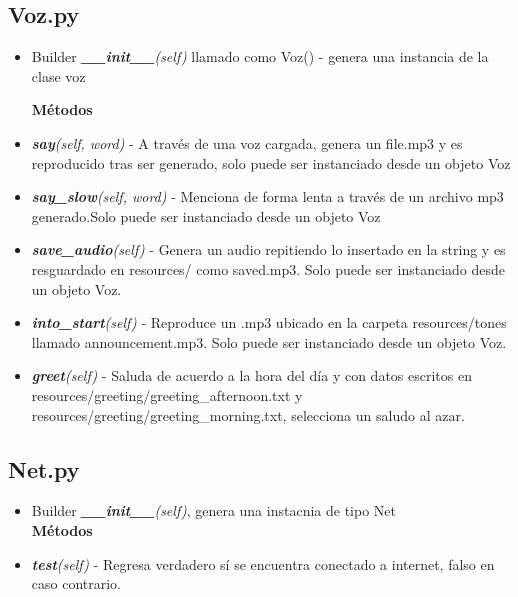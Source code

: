 \documentclass{article}
\begin{document}
    \subsection{Voz.py}
        \begin{itemize}
            \item
            \begin{lstlistings}
            Builder \textit{\textbf{\_\_init\_\_}(self)} llamado como Voz() - genera una instancia de la clase voz
            
            \end{lstlistings}
            
           \textbf{Métodos}
            \item \textit{\textbf{say}(self, word)}  - A través de una voz cargada, genera un file.mp3 y es reproducido tras ser generado, solo puede ser instanciado desde un objeto Voz
            
            \item \textit{\textbf{say\_slow}(self, word)} - Menciona de forma lenta a través de un archivo mp3 generado.Solo puede ser instanciado desde un objeto Voz
            
            \item \textit{\textbf{save\_audio}(self)} - Genera un audio repitiendo lo insertado en la string y es resguardado en resources/ como saved.mp3. Solo puede ser instanciado desde un objeto Voz.
            
            \item \textit{\textbf{into\_start}(self)} - Reproduce un .mp3 ubicado en la carpeta resources/tones llamado announcement.mp3. Solo puede ser instanciado desde un objeto Voz.
            
            \item \textit{\textbf{greet}(self)} - Saluda de acuerdo a la hora del día y con datos escritos en resources/greeting/greeting\_afternoon.txt y
            resources/greeting/greeting\_morning.txt, selecciona un saludo al azar.
        \end{itemize}
    \subsection{Net.py}
        \begin{itemize}
            \item Builder \textit{\textbf{\_\_init\_\_}(self)}, genera una instacnia de tipo Net\\
            \textbf{Métodos}
            \item \textit{\textbf{test}(self)} - Regresa verdadero sí se encuentra conectado a internet, falso en caso contrario. 
        \end{itemize}
\end{document}
